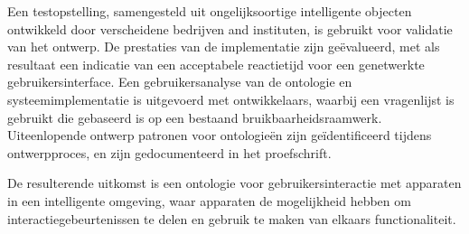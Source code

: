 Een testopstelling, samengesteld uit ongelijksoortige intelligente objecten ontwikkeld door verscheidene bedrijven and instituten, is gebruikt voor validatie van het ontwerp. De pres\-ta\-ties van de implementatie zijn ge\"evalueerd, met als resultaat een indicatie van een acceptabele reactietijd voor een ge\-net\-werk\-te gebruikersinterface. Een gebruikersanalyse van de ontologie en systeemimplementatie is uitgevoerd met ontwikkelaars, waarbij een vragenlijst is gebruikt die gebaseerd is op een bestaand bruikbaarheidsraamwerk. Uiteenlopende ontwerp patronen voor ontologie\"en zijn ge\"identificeerd tijdens ontwerpproces, en zijn gedocumenteerd in het proefschrift.

De resulterende uitkomst is een ontologie voor gebruikersinteractie met apparaten in een intelligente omgeving, waar apparaten de mogelijkheid hebben om interactiegebeurtenissen te delen en gebruik te maken van elkaars functionaliteit. 



\endgroup			

\vfill
